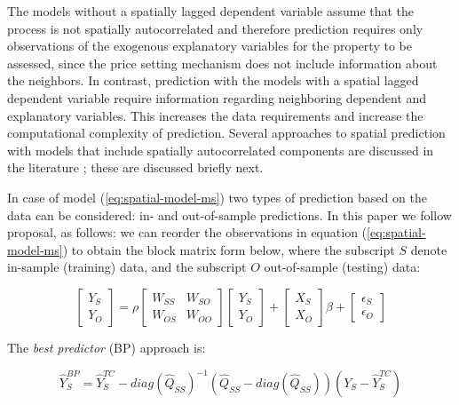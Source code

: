 \documentclass[Royal,times,sageh]{sagej}
\begin{document}
The models without a spatially lagged dependent variable assume that the
process is not spatially autocorrelated and therefore prediction
requires only observations of the exogenous explanatory variables for
the property to be assessed, since the price setting mechanism does not
include information about the neighbors. In contrast, prediction with
the models with a spatial lagged dependent variable require information
regarding neighboring dependent and explanatory variables. This
increases the data requirements and increase the computational
complexity of prediction. Several approaches to spatial prediction with
models that include spatially autocorrelated components are discussed in
the literature \citep[e.g.,][]{goulard2017}; these are discussed briefly
next.

In case of model (\ref{eq:spatial-model-ms}) two types of prediction
based on the data can be considered: in- and out-of-sample predictions.
In this paper we follow \citet{goulard2017} proposal, as follows: we can
reorder the observations in equation (\ref{eq:spatial-model-ms}) to
obtain the block matrix form below, where the subscript \(S\) denote
in-sample (training) data, and the subscript \(O\) out-of-sample
(testing) data:

\begin{equation}
  \begin{bmatrix}{Y_S} \\ {Y_O} \end{bmatrix} = \rho \begin{bmatrix}{W_{SS}} & {W_{SO}} \\ {W_{OS}} & {W_{OO}} \end{bmatrix} \begin{bmatrix}{Y_S} \\ {Y_O} \end{bmatrix} + \begin{bmatrix}{X_S} \\ {X_O} \end{bmatrix} \beta + \begin{bmatrix}{\epsilon_S} \\ {\epsilon_O} \end{bmatrix} 
\label{eq:block-matrix}
\end{equation}

The \emph{best predictor} (BP) approach is:

\begin{equation}
{\hat Y_S^{BP}} = {\hat Y_S^{TC}} - diag({\hat Q_{SS}})^{-1} (\hat Q_{SS}-diag(\hat Q_{SS})) (Y_S - {\hat Y_S^{TC}}) 
\end{equation}
\end{document}
